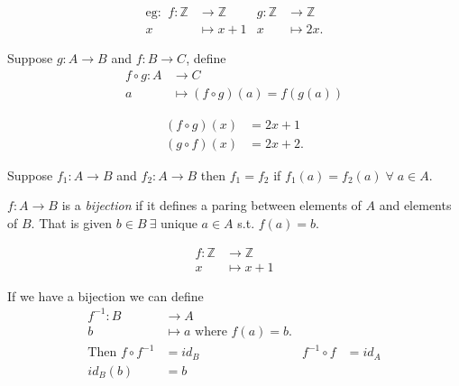 \begin{example}
  \begin{align*}
    \text{eg: }\ f: \mathbb{Z} &\to \mathbb{Z} & g: \mathbb{Z} &\to \mathbb{Z} \\
    x &\mapsto x + 1 & x &\mapsto 2x.
  \end{align*}
\end{example} 

\begin{definition}
  Suppose \(g: A \to B\) and \(f: B \to C\), define
  \begin{align*}
    f \circ g: A &\to C \\
    a &\mapsto (f \circ g)(a) = f(g(a))
  \end{align*} 
\end{definition} 

\begin{example}
  \begin{align*}
    (f \circ g)(x) &= 2x + 1 \\
    (g \circ f)(x) &= 2x + 2.
  \end{align*} 
\end{example} 

Suppose \(f_1: A \to B\) and \(f_2: A \to B\) then \(f_1 = f_2\) if \(f_1(a) = f_2(a) \; \forall \; a \in A\).

\begin{definition}
  \(f: A \to B\) is a \emph{bijection} if it defines a paring between elements of \(A\) and elements of \(B\). That is given \(b \in B \ \exists\) unique \(a \in A\) s.t. \(f(a) = b\).
\end{definition} 

\begin{example}
  \begin{align*}
    f: \mathbb{Z} &\to \mathbb{Z} \\
    x &\mapsto x + 1
  \end{align*}
\end{example} 

\begin{definition}
  If we have a bijection we can define
  \begin{align*}
      f^{-1}: B &\to A &&\\
      b &\mapsto a \text{ where } f(a) = b. &&\\
      \text{Then } f \circ f^{-1} &= id_B & f^{-1} \circ f &= id_A \\
      id_B(b) &= b
  \end{align*}
\end{definition} 


